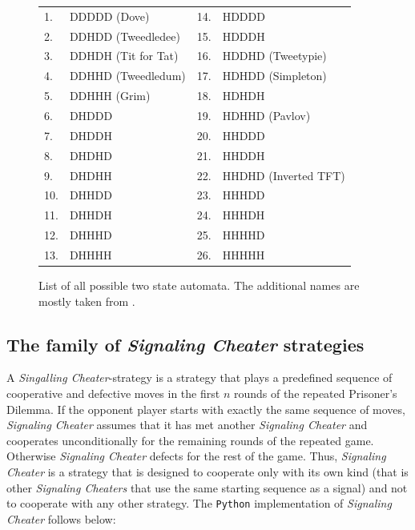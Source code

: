 \begin{figure}
\begin{center}
\begin{tabular}{llll}
1.  & DDDDD (Dove)        & 14. & HDDDD \\
2.  & DDHDD (Tweedledee)  & 15. & HDDDH \\
3.  & DDHDH (Tit for Tat) & 16. & HDDHD (Tweetypie) \\
4.  & DDHHD (Tweedledum)  & 17. & HDHDD (Simpleton) \\
5.  & DDHHH (Grim)        & 18. & HDHDH \\
6.  & DHDDD               & 19. & HDHHD (Pavlov) \\
7.  & DHDDH               & 20. & HHDDD \\
8.  & DHDHD               & 21. & HHDDH \\
9.  & DHDHH               & 22. & HHDHD (Inverted TFT) \\
10. & DHHDD               & 23. & HHHDD \\
11. & DHHDH               & 24. & HHHDH \\
12. & DHHHD               & 25. & HHHHD \\
13. & DHHHH               & 26. & HHHHH \\
\end{tabular}
\caption{\label{AllTwoStateAutomata} List of all possible two state
  automata. The additional names are mostly taken from
  \cite[p. 296]{binmore:1998}.}
\end{center}
\end{figure}


\newpage

\subsection{The family of {\em Signaling Cheater} strategies}
\label{signalingCheaters}

A {\em Singalling Cheater}-strategy is a strategy that plays a predefined
sequence of cooperative and defective moves in the first $n$ rounds of the
repeated Prisoner's Dilemma. If
the opponent player starts with exactly the same sequence of moves, {\em
  Signaling Cheater} assumes that it has met another {\em Signaling Cheater}
and cooperates unconditionally for the remaining rounds of the repeated game.
Otherwise {\em Signaling Cheater} defects for the rest of the game. Thus,
{\em Signaling Cheater} is a strategy that is designed to cooperate only with
its own kind (that is other {\em Signaling Cheaters} that use the same
starting sequence as a signal) and not to cooperate with any other strategy.
The {\tt Python} implementation of {\em Signaling Cheater} follows below:


